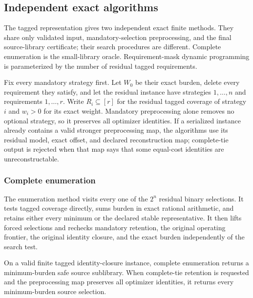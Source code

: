\subsection{Independent exact algorithms}
\label{subsec:aor-exact-algorithms}

The tagged representation gives two independent exact finite methods.  They
share only validated input, mandatory-selection preprocessing, and the final
source-library certificate; their search procedures are different.  Complete
enumeration is the small-library oracle.  Requirement-mask dynamic programming
is parameterized by the number of residual tagged requirements.

Fix every mandatory strategy first.  Let $W_0$ be their exact burden, delete
every requirement they satisfy, and let the residual instance have strategies
$1,\ldots,n$ and requirements $1,\ldots,r$.  Write $R_i\subseteq[r]$ for
the residual tagged coverage of strategy $i$ and $w_i>0$ for its exact weight.
Mandatory preprocessing alone removes no optional strategy, so it preserves
all optimizer identities.  If a serialized instance already contains a valid
stronger preprocessing map, the algorithms use its residual model, exact
offset, and declared reconstruction map; complete-tie output is rejected when
that map says that some equal-cost identities are unreconstructable.

\subsubsection{Complete enumeration}
The enumeration method visits every one of the $2^n$ residual binary
selections.  It tests tagged coverage directly, sums burden in exact rational
arithmetic, and retains either every minimum or the declared stable
representative.  It then lifts forced selections and rechecks mandatory
retention, the original operating frontier, the original identity closure, and
the exact burden independently of the search test.

\begin{proposition}
\label{prop:aor-complete-enumeration}
On a valid finite tagged identity-closure instance, complete enumeration
returns a minimum-burden safe source sublibrary.  When complete-tie retention
is requested and the preprocessing map preserves all optimizer identities, it
returns every minimum-burden source selection.
\end{proposition}

